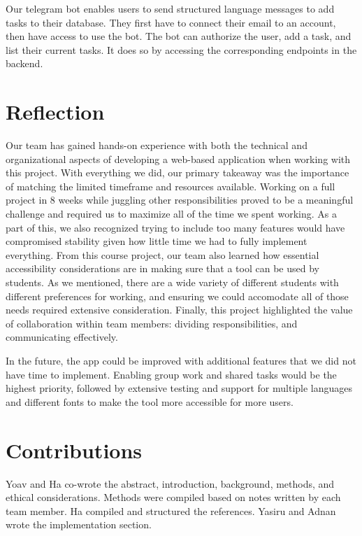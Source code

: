 \documentclass[11pt,oneside]{article}
\begin{document}
Our telegram bot enables users to send structured language messages to add tasks to their database. They first have to connect their email to an account, then have access to use the bot. The bot can authorize the user, add a task, and list their current tasks. It does so by accessing the corresponding endpoints in the backend.

\section{Reflection}
Our team has gained hands-on experience with both the technical and organizational aspects of developing a web-based application when working with this project. With everything we did, our primary takeaway was the importance of matching the limited timeframe and resources available. Working on a full project in 8 weeks while juggling other responsibilities proved to be a meaningful challenge and required us to maximize all of the time we spent working. As a part of this, we also recognized trying to include too many features would have compromised stability given how little time we had to fully implement everything. From this course project, our team also learned how essential accessibility considerations are in making sure that a tool can be used by students. As we mentioned, there are a wide variety of different students with different preferences for working, and ensuring we could accomodate all of those needs required extensive consideration. Finally, this project highlighted the value of collaboration within team members: dividing responsibilities, and communicating effectively. 

In the future, the app could be improved with additional features that we did not have time to implement. Enabling group work and shared tasks would be the highest priority, followed by extensive testing and support for multiple languages and different fonts to make the tool more accessible for more users.


\section{Contributions}
Yoav and Ha co-wrote the abstract, introduction, background, methods, and ethical considerations. Methods were compiled based on notes written by each team member. Ha compiled and structured the references. Yasiru and Adnan wrote the implementation section.




\end{document}
